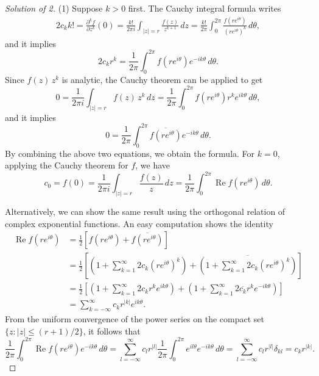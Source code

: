 \documentclass[a4paper]{article}
\theoremstyle{definition}
\renewcommand{\Re}{\operatorname{Re}}
\renewcommand{\bar}{\overline}
\begin{document}
\newpage
\begin{proof}[Solution of 2]
(1)
Suppose $k>0$ first.
The Cauchy integral formula writes
\begin{align*}
2c_kk!=\frac{\partial^kf}{\partial z^k}(0)=\frac{k!}{2\pi i}\int_{|z|=r}\frac{f(z)}{z^{k+1}}\,dz=\frac{k!}{2\pi}\int_0^{2\pi}\frac{f(re^{i\theta})}{(re^{i\theta})^k}\,d\theta,
\end{align*}
and it implies
\[2c_kr^k=\frac1{2\pi}\int_0^{2\pi}f(re^{i\theta})e^{-ik\theta}\,d\theta.\]
Since $f(z)\,z^k$ is analytic, the Cauchy theorem can be applied to get
\[0=\frac1{2\pi i}\int_{|z|=r}f(z)\,z^k\,dz=\frac1{2\pi}\int_0^{2\pi}f(re^{i\theta})r^ke^{ik\theta}\,d\theta,\]
and it implies
\[0=\frac1{2\pi}\int_0^{2\pi}\bar{f(re^{i\theta})}e^{-ik\theta}\,d\theta.\]
By combining the above two equations, we obtain the formula.
For $k=0$, applying the Cauchy theorem for $f$, we have
\[c_0=f(0)=\frac1{2\pi i}\int_{|z|=r}\frac{f(z)}z\,dz=\frac1{2\pi}\int_0^{2\pi}\Re f(re^{i\theta})\,d\theta.\]

Alternatively, we can show the same result using the orthogonal relation of complex exponential functions.
An easy computation shows the identity
\begin{align*}
\Re f(re^{i\theta})
&=\frac12[f(re^{i\theta})+\bar{f(re^{i\theta})}]\\
&=\frac12\left[\left(1+\sum_{k=1}^\infty2c_k(re^{i\theta})^k\right)+\bar{\left(1+\sum_{k=1}^\infty2c_k(re^{i\theta})^k\right)}\right]\\
&=\frac12\left[\left(1+\sum_{k=1}^\infty2c_kr^ke^{ik\theta}\right)+\left(1+\sum_{k=1}^\infty2\bar{c_k}r^ke^{-ik\theta}\right)\right]\\
&=\sum_{k=-\infty}^\infty c_kr^{|k|}e^{ik\theta}.
\end{align*}
From the uniform convergence of the power series on the compact set $\{z:|z|\le(r+1)/2\}$, it follows that
\[\frac1{2\pi}\int_0^{2\pi}\Re f(re^{i\theta})e^{-ik\theta}\,d\theta=\sum_{l=-\infty}^{\infty}c_lr^{|l|}\frac1{2\pi}\int_0^{2\pi}e^{il\theta}e^{-ik\theta}\,d\theta=\sum_{l=-\infty}^{\infty}c_lr^{|l|}\delta_{kl}=c_kr^{|k|}.\]


\end{proof}
\end{document}
